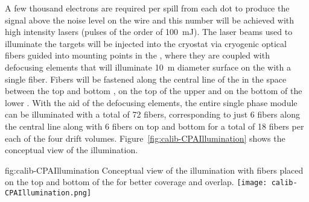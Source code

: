 A few thousand electrons are required per spill from each dot to produce the signal above the noise level on the wire and this number will be achieved with high intensity lasers (pulses of the order of \SI{100}{\milli\joule}). The laser beams used to illuminate the targets will be injected into the cryostat via cryogenic optical fibers guided into mounting points in the , where they are coupled with defocusing elements that will illuminate \SI{10}{\m} diameter surface on the   with a single fiber. Fibers will be fastened along the central line of the  in the space between the top and bottom , on the top of the upper  and on the bottom of the lower . With the aid of the defocusing elements, the entire single phase module can be illuminated with a total of \num{72} fibers, corresponding to just \num{6} fibers along the central line along with \num{6} fibers on top and bottom for a total of \num{18} fibers per each of the four drift volumes. Figure~\ref{fig:calib-CPAIllumination} shows the conceptual view of the  illumination.

\begin{dunefigure}{fig:calib-CPAIllumination}
{Conceptual view of the  illumination with fibers placed on the top and bottom of the  for better coverage and overlap.} 
\texttt{[image: calib-CPAIllumination.png]} 
\end{dunefigure}



